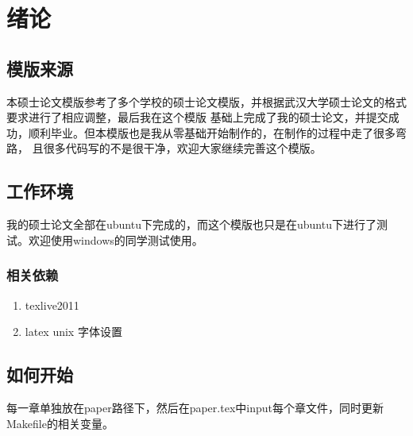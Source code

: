 \chapter{绪论}

\setcounter{page}{1}

\section{模版来源}
本硕士论文模版参考了多个学校的硕士论文模版，并根据武汉大学硕士论文的格式要求进行了相应调整，最后我在这个模版
基础上完成了我的硕士论文，并提交成功，顺利毕业。但本模版也是我从零基础开始制作的，在制作的过程中走了很多弯路，
且很多代码写的不是很干净，欢迎大家继续完善这个模版。

\section{工作环境}
我的硕士论文全部在ubuntu下完成的，而这个模版也只是在ubuntu下进行了测试。欢迎使用windows的同学测试使用。

\subsection{相关依赖}
\begin{enumerate}
    \item texlive2011
    \item latex unix 字体设置
\end{enumerate}

\section{如何开始}
每一章单独放在paper路径下，然后在paper.tex中input每个章文件，同时更新Makefile的相关变量。
